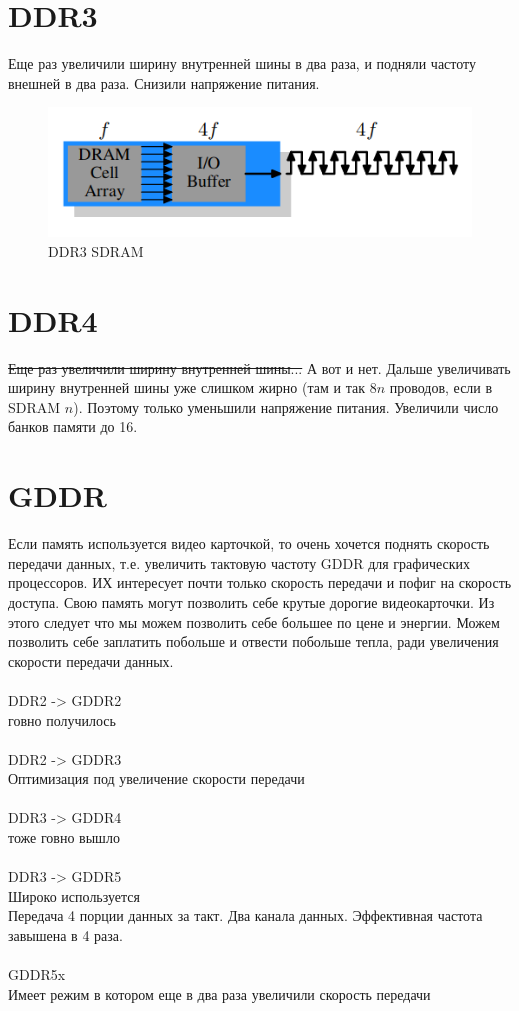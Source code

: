 \documentclass[12pt, a4paper]{article}
\begin{document}
\section{DDR3}
Еще раз увеличили ширину внутренней шины в два раза, и подняли частоту внешней в два раза. Снизили напряжение питания.
\begin{figure}[h]
    \centering
    \includegraphics[scale=0.6]{./images/DDR3_SDRAM.png}
    \caption{DDR3 SDRAM}
    \label{fig:DDR2_SDRAM}
\end{figure}
\section{DDR4}
\sout{Еще раз увеличили ширину внутренней шины...} А вот и нет. Дальше увеличивать ширину внутренней шины уже слишком жирно (там и так $8n$ проводов, если в SDRAM $n$). Поэтому только уменьшили напряжение питания. Увеличили число банков памяти до 16.\\
\section{GDDR}
Если память используется видео карточкой, то очень хочется поднять скорость передачи данных, т.е. увеличить тактовую частоту
GDDR для графических процессоров. ИХ интересует почти только скорость передачи и пофиг на скорость доступа. Свою память могут позволить себе крутые дорогие видеокарточки. Из этого следует что мы можем позволить себе большее по цене и энергии. Можем позволить себе заплатить побольше и отвести побольше тепла, ради увеличения скорости передачи данных. \\
\\
DDR2 -> GDDR2\\
говно получилось\\
\\
DDR2 -> GDDR3\\
Оптимизация под увеличение скорости передачи\\
\\
DDR3 -> GDDR4\\
тоже говно вышло\\
\\
DDR3 -> GDDR5\\
Широко используется\\
Передача 4 порции данных за такт. Два канала данных. Эффективная частота завышена в 4 раза.\\
\\
GDDR5x\\
Имеет режим в котором еще в два раза увеличили скорость передачи
\end{document}

